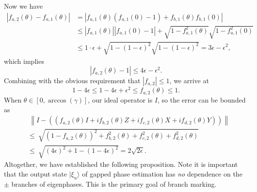 \documentclass[letterpaper,onecolumn,11pt,accepted=2026-02-14]{quantumarticle}
\newcommand{\abs}[1]{\left\lvert#1\right\rvert}
\newcommand{\norm}[1]{\left\lVert#1\right\rVert}
\theoremstyle{remark}
\theoremstyle{plain}
\newcommand{\ket}[1]{|#1\rangle}
\begin{document}
Now we have
\begin{equation}
\begin{aligned}
    \abs{f_{a,2}(\theta)-f_{a,1}(\theta)}
    &=\abs{f_{a,1}(\theta)\left(f_{a,1}(0)-1\right)+f_{b,1}(\theta)f_{b,1}(0)}\\
    &\leq\abs{f_{a,1}(\theta)}\abs{f_{a,1}(0)-1}+\sqrt{1-f_{a,1}^2(\theta)}\sqrt{1-f_{a,1}^2(0)}\\
    &\leq1\cdot\epsilon+\sqrt{1-(1-\epsilon)^2}\sqrt{1-(1-\epsilon)^2}
    =3\epsilon-\epsilon^2,
\end{aligned}
\end{equation}
which implies
\begin{equation}
    \abs{f_{a,2}(\theta)-1}\leq4\epsilon-\epsilon^2.
\end{equation}
Combining with the obvious requirement that $\abs{f_{a,2}}\leq1$, we arrive at
\begin{equation}
    1-4\epsilon\leq1-4\epsilon+\epsilon^2\leq f_{a,2}(\theta)\leq1.
\end{equation}
When $\theta\in\left[0,\arccos\left(\gamma\right)\right]$, our ideal operator is $I$, so the error can be bounded as
\begin{equation}
\begin{aligned}
    &\ \norm{I-\left(\left(f_{a,2}(\theta)I+if_{b,2}(\theta)Z+if_{c,2}(\theta)X+if_{d,2}(\theta)Y\right)\right)}\\
    &\leq\ \sqrt{
    (1-f_{a,2}(\theta))^2+f_{b,2}^2(\theta)+f_{c,2}^2(\theta)+f_{d,2}^2(\theta)}\\
    &\leq\ \sqrt{(4\epsilon)^2+1-(1-4\epsilon)^2}
    =2\sqrt{2\epsilon}.
\end{aligned}
\end{equation}
Altogether, we have established the following proposition. Note it is important that the output state $\ket{\xi_u}$ of gapped phase estimation has \emph{no} dependence on the $\pm$ branches of eigenphases. This is the primary goal of branch marking. 
\end{document}
